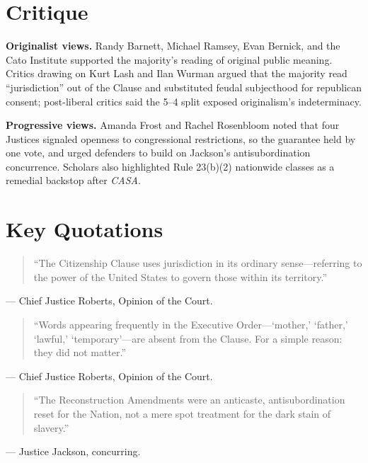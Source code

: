 \documentclass[12pt]{article}
\begin{document}
\section{Critique}

\textbf{Originalist views.} Randy Barnett, Michael Ramsey, Evan Bernick, and the Cato Institute supported the majority's reading of original public meaning. Critics drawing on Kurt Lash and Ilan Wurman argued that the majority read ``jurisdiction'' out of the Clause and substituted feudal subjecthood for republican consent; post-liberal critics said the 5--4 split exposed originalism's indeterminacy.

\textbf{Progressive views.} Amanda Frost and Rachel Rosenbloom noted that four Justices signaled openness to congressional restrictions, so the guarantee held by one vote, and urged defenders to build on Jackson's antisubordination concurrence. Scholars also highlighted Rule 23(b)(2) nationwide classes as a remedial backstop after \textit{CASA}.

\section{Key Quotations}

\begin{quote}
``The Citizenship Clause uses jurisdiction in its ordinary sense---referring to the power of the United States to govern those within its territory.''
\end{quote}
\noindent --- Chief Justice Roberts, Opinion of the Court.

\begin{quote}
``Words appearing frequently in the Executive Order---`mother,' `father,' `lawful,' `temporary'---are absent from the Clause. For a simple reason: they did not matter.''
\end{quote}
\noindent --- Chief Justice Roberts, Opinion of the Court.

\begin{quote}
``The Reconstruction Amendments were an anticaste, antisubordination reset for the Nation, not a mere spot treatment for the dark stain of slavery.''
\end{quote}
\noindent --- Justice Jackson, concurring.
\end{document}
